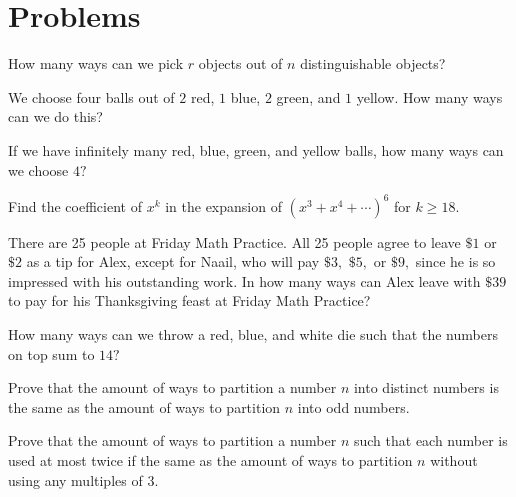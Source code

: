 \documentclass{article}
\begin{document}
\pagebreak

\section{Problems}


\begin{prob}{1}
How many ways can we pick $r$ objects out of $n$ distinguishable objects?
\end{prob}
    
\begin{prob}[]{2}
We choose four balls out of $2$ red, $1$ blue, $2$ green, and $1$ yellow. How many ways can we do this?
\end{prob}
    
\begin{prob}[]{2}
If we have infinitely many red, blue, green, and yellow balls, how many ways can we choose $4?$
\end{prob}
    
\begin{prob}[]{3}
Find the coefficient of $x^k$ in the expansion of $(x^3+x^4+\cdots)^6$ for $k\geq 18.$
\end{prob}

\begin{prob}[]{3}
There are 25 people at Friday Math Practice. All 25 people agree to leave $\$1$ or $\$2$ as a tip for Alex, except for Naail, who will pay $\$3,$ $\$5,$ or $\$9,$ since he is so impressed with his outstanding work. In how many ways can Alex leave with $\$39$ to pay for his Thanksgiving feast at Friday Math Practice?
\end{prob}

\begin{prob}[]{3}
How many ways can we throw a red, blue, and white die such that the numbers on top sum to $14?$
\end{prob}
    
\begin{prob}[]{4}
Prove that the amount of ways to partition a number $n$ into distinct numbers is the same as the amount of ways to partition $n$ into odd numbers.
\end{prob}
    
\begin{prob}[]{4}
Prove that the amount of ways to partition a number $n$ such that each number is used at most twice if the same as the amount of ways to partition $n$ without using any multiples of $3.$
\end{prob}
\end{document}
